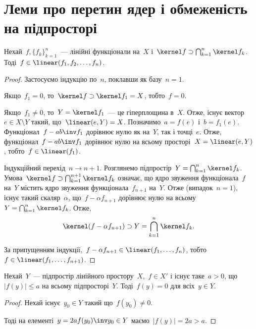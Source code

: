 \section{Леми про перетин ядер і обмеженість на підпросторі}

\begin{lemma}
    \label{lem:kernel-intersection-supset-linear-combination}
    Нехай~$f, \{f_k\}_{k = 1}^n$~--- лінійні функціонали на~$X$ і~$\kernel f \supset \bigcap_{k = 1}^n \kernel f_k$. Тоді~$f \in \linear(f_1, f_2, \dots, f_n)$.
\end{lemma}

\begin{proof}
    Застосуємо індукцію по~$n$, поклавши як базу~$n = 1$.

    Якщо~$f_1 = 0$, то~$\kernel f \supset \kernel f_1 = X$, тобто~$f = 0$.

    Якщо~$f_1 \ne 0$, то~$Y = \kernel f_1$~--- це гіперплощина в~$X$. Отже, існує вектор~$e \in X \setminus Y$ такий, що~$\linear(e, Y) = X$. Позначимо~$a = f(e)$ і~$b = f_1(e)$. Функціонал~$f - ab\inv f_1$ дорівнює нулю як на~$Y$, так і точці~$e$. Отже, функціонал~$f - ab\inv f_1$ дорівнює нулю на всьому просторі~$X = \linear(e, Y)$, тобто~$f \in \linear(f_1)$.

    Індукційний перехід~$n \to n + 1$. Розглянемо підпростір~$Y = \bigcap_{k = 1}^n \kernel f_k$. Умова~$\kernel f \supset \bigcap_{k = 1}^{n + 1} \kernel f_k$ означає, що ядро звуження функціонала~$f$ на~$Y$ містить ядро звуження функціонала~$f_{n + 1}$ на~$Y$. Отже (випадок~$n = 1$), існує такий скаляр~$\alpha$, що~$f - \alpha f_{n + 1}$ дорівнює нулю на всьому~$Y = \bigcap_{k = 1}^n \kernel f_k$. Отже,
    \begin{equation*}
        \kernel (f - \alpha f_{n + 1}) \supset Y = \bigcap_{k = 1}^n \kernel f_k.
    \end{equation*}

    За припущенням індукції,~$f - \alpha f_{n + 1} \in \linear(f_1, \dots, f_n)$, тобто~$f \in \linear(f_1, \dots, f_{n + 1})$.
\end{proof}

\begin{lemma}
    \label{lem:linear-subspace-bounded-implies-zero}
    Нехай~$Y$~--- підпростір лінійного простору~$X$,~$f \in X'$ і існує таке~$a > 0$, що~$|f(y)| \le a$ на всьому підпросторі~$Y$. Тоді~$f(y) = 0$ для всіх~$y \in Y$.
\end{lemma}

\begin{proof}
    Нехай існує~$y_0 \in Y$ такий що~$f(y_0) \ne 0$.
    
    Тоді на елементі~$y = 2 a f(y_0)\inv y_0 \in Y$ маємо~$|f(y)| = 2 a > a$.
\end{proof}

